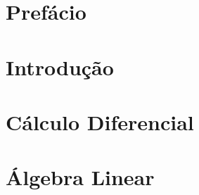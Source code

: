 \documentclass[a5paper,10pt]{article}
\numberwithin{equation}{section}
\begin{document}
\pagestyle{empty}


\section*{Prefácio}

\pagestyle{empty}
\newpage
\tableofcontents
\newpage
\listoffigures
\newpage
{}

\setcounter{page}{1}
\pagestyle{fancy}
\section{Introdução}

\section{Cálculo Diferencial}


\section{Álgebra Linear}
\end{document}
